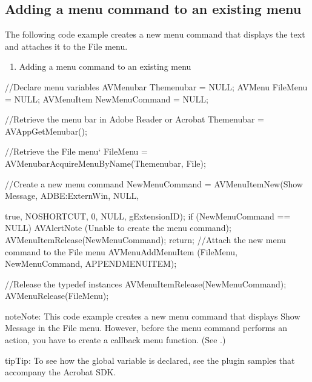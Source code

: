 \documentclass[letterpaper,12pt,english,openany,oneside]{sphinxmanual}
\begin{document}
\subsection{Adding a menu command to an existing menu}
\label{\detokenize{Plugins_Menu:adding-a-menu-command-to-an-existing-menu}}
The following code example creates a new menu command that displays the text   and attaches it to the File menu.
\begin{enumerate}
%
\item {} 
Adding a menu command to an existing menu

\end{enumerate}

\begin{sphinxVerbatim}[commandchars=\\\{\}]
//Declare menu variables
   AVMenubar Themenubar = NULL;
   AVMenu FileMenu = NULL;
   AVMenuItem NewMenuCommand = NULL;

//Retrieve the menu bar in Adobe Reader or Acrobat
   Themenubar = AVAppGetMenubar();

//Retrieve the File menu`
   FileMenu = AVMenubarAcquireMenuByName(Themenubar, \PYGZdq{}File\PYGZdq{});

//Create a new menu command
   NewMenuCommand = AVMenuItemNew(\PYGZdq{}Show Message\PYGZdq{}, \PYGZdq{}ADBE:ExternWin\PYGZdq{}, NULL,

   true, NO\PYGZus{}SHORTCUT, 0, NULL, gExtensionID);
   if (NewMenuCommand == NULL)
   \PYGZob{}
   AVAlertNote (\PYGZdq{}Unable to create the menu command\PYGZdq{});
   AVMenuItemRelease(NewMenuCommand);
   return;
   \PYGZcb{}
//Attach the new menu command to the File menu
   AVMenuAddMenuItem (FileMenu, NewMenuCommand, APPEND\PYGZus{}MENUITEM);

//Release the typedef instances
   AVMenuItemRelease(NewMenuCommand);
   AVMenuRelease(FileMenu);
\end{sphinxVerbatim}

\begin{sphinxadmonition}{note}{Note:}
This code example creates a new menu command that displays Show Message in the File menu. However, before the menu command performs an action, you have to create a callback menu function. (See .)
\end{sphinxadmonition}

\begin{sphinxadmonition}{tip}{Tip:}
To see how the global  variable is declared, see the plugin samples that accompany the Acrobat SDK.
\end{sphinxadmonition}
\end{document}
